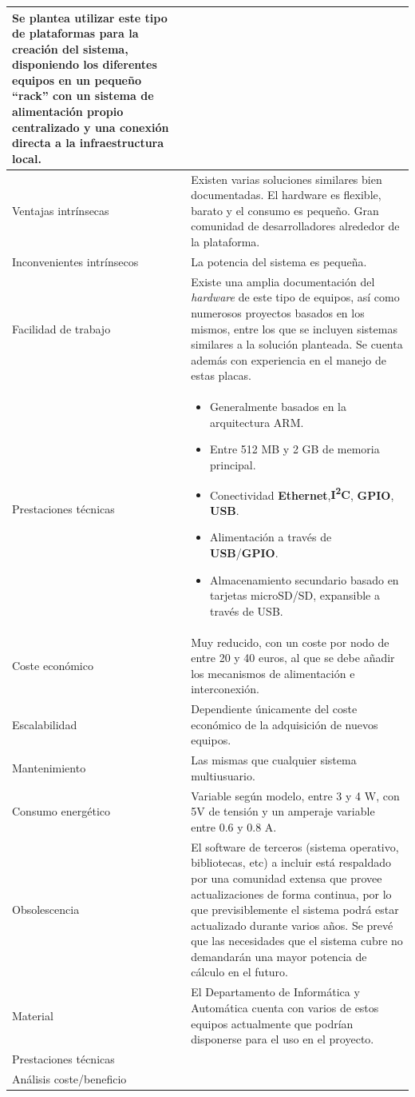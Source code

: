 \begin{table}
\begin{tabular}{|p{2.3cm}|p{11cm}|}
Se plantea utilizar este tipo de plataformas para la creación del sistema, disponiendo los diferentes equipos en un pequeño ``rack'' con un sistema de alimentación propio centralizado y una conexión directa a la infraestructura local.\\
\hline
Ventajas intrínsecas&Existen varias soluciones similares bien documentadas.
El hardware es flexible, barato y el consumo es pequeño.
Gran comunidad de desarrolladores alrededor de la plataforma.\\
\hline
Inconvenientes intrínsecos&La potencia del sistema es pequeña.\\
\hline
Facilidad de trabajo&Existe una amplia documentación del \textit{hardware} de este tipo de equipos, así como numerosos proyectos basados en los mismos, entre los que se incluyen sistemas similares a la solución planteada. Se cuenta además con experiencia en el manejo de estas placas.\\
\hline
Prestaciones técnicas&
\begin{itemize}[noitemsep]
  \item Generalmente basados en la arquitectura ARM.
  \item Entre 512 MB y 2 GB de memoria principal.
  \item Conectividad \textbf{Ethernet},\textbf{I\textsuperscript{2}C}, \textbf{GPIO}, \textbf{USB}.
  \item Alimentación a través de \textbf{USB}/\textbf{GPIO}.
  \item Almacenamiento secundario basado en tarjetas microSD/SD, expansible a través de USB.
\end{itemize}\\
\hline
Coste económico&Muy reducido, con un coste por nodo de entre 20 y 40 euros, al que se debe añadir los mecanismos de alimentación e interconexión.\\
\hline
Escalabilidad&Dependiente únicamente del coste económico de la adquisición de nuevos equipos.\\
\hline
Mantenimiento&Las mismas que cualquier sistema multiusuario.\\
\hline
Consumo energético&Variable según modelo, entre 3 y 4 W, con 5V de tensión y un amperaje variable entre 0.6 y 0.8 A.\\
\hline
Obsolescencia&El software de terceros (sistema operativo, bibliotecas, etc) a incluir está respaldado por una comunidad extensa que provee actualizaciones de forma continua, por lo que previsiblemente el sistema podrá estar actualizado durante varios años.
Se prevé que las necesidades que el sistema cubre no demandarán una mayor potencia de cálculo en el futuro.\\
\hline
Material&El Departamento de Informática y Automática cuenta con varios de estos equipos actualmente que podrían disponerse para el uso en el proyecto.\\
\hline
Prestaciones técnicas&\\
\hline
Análisis coste/beneficio&\\
\hline
\end{tabular}
\end{table}

